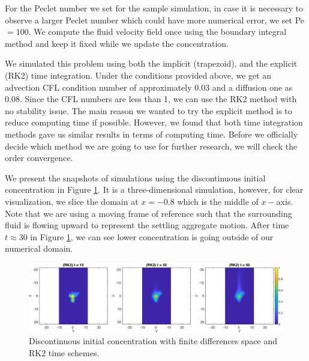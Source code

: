For the Peclet number we set for the sample simulation, in case it is necessary to observe a larger Peclet number which could have more numerical error, we set Pe $=100$.
We compute the fluid velocity field once using the boundary integral method and keep it fixed while we update the concentration. 
\par
We simulated this problem using both the implicit (trapezoid), and the explicit (RK2) time integration. Under the conditions provided above, we get an advection CFL condition number of approximately 0.03 and a diffusion one as 0.08. Since the CFL numbers are less than 1, we can use the RK2 method with no stability issue. 
The main reason we wanted to try the explicit method is to reduce computing time if possible. However, we found that both time integration methods gave us similar results in terms of computing time. Before we officially decide which method we are going to use for further research, we will check the order convergence.
\par
We present the snapshots of simulations using the discontinuous initial concentration in Figure \ref{fig_ic4_RK2_snap135}. It is a three-dimensional simulation, however, for clear visualization, we slice the domain at $x= -0.8$ which is the middle of $x-$axis.
 Note that we are using a moving frame of reference such that the surrounding fluid is flowing upward to represent the settling aggregate motion.
After time $t \approx 30$ in Figure \ref{fig_ic4_RK2_snap135}, we can see lower concentration is going outside of our numerical domain.  
 \begin{figure}[h]
 \begin{center}
	\includegraphics[scale=0.75]{./figures/fig_ic4_RK2_snap135}
 \end{center}
 \caption{Discontinuous initial concentration with finite differences space and RK2 time schemes.}
 \label{fig_ic4_RK2_snap135}
 \end{figure}
 
